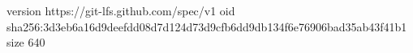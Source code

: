 version https://git-lfs.github.com/spec/v1
oid sha256:3d3eb6a16d9deefdd08d7d124d73d9cfb6dd9db134f6e76906bad35ab43f41b1
size 640
